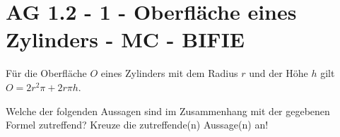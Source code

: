 \section{AG 1.2 - 1 - Oberfläche eines Zylinders - MC - BIFIE}

\begin{beispiel}[AG 1.2]{1} %
				Für die Oberfläche $O$ eines Zylinders mit dem Radius $r$ und der Höhe $h$ gilt $O=2r^2\pi+2r\pi h$.
				
				Welche der folgenden Aussagen sind im Zusammenhang mit der gegebenen Formel zutreffend? Kreuze die zutreffende(n) Aussage(n) an!
\end{beispiel}